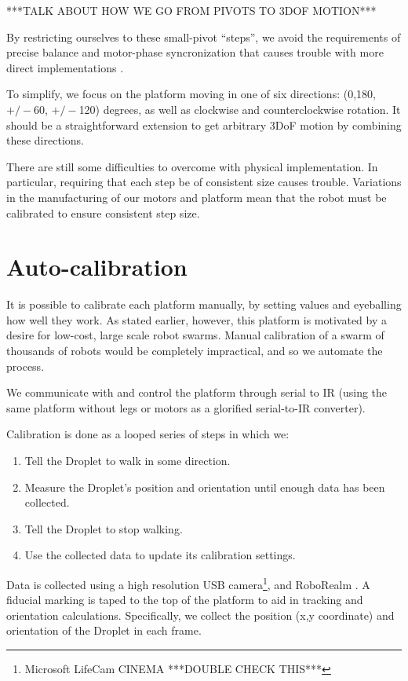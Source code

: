 \documentclass[letterpaper, 10pt, conference]{ieeeconf}
\begin{document}
***TALK ABOUT HOW WE GO FROM PIVOTS TO 3DOF MOTION***

By restricting ourselves to these small-pivot ``steps'', we avoid the requirements of precise balance and motor-phase syncronization that causes trouble with more direct implementations \cite{Vartholomeos2006}.

To simplify, we focus on the platform moving in one of six directions: (0,180, $+/-$60, $+/-$120) degrees, as well as clockwise and counterclockwise rotation. It should be a straightforward extension to get arbitrary 3DoF motion by combining these directions.

 There are still some difficulties to overcome with physical implementation. In particular, requiring that each step be of consistent size causes trouble. Variations in the manufacturing of our motors and platform mean that the robot must be calibrated to ensure consistent step size.

\section{Auto-calibration}

It is possible to calibrate each platform manually, by setting values and eyeballing how well they work. As stated earlier, however, this platform is motivated by a desire for low-cost, large scale robot swarms.  Manual calibration of a swarm of thousands of robots would be completely impractical, and so we automate the process.

We communicate with and control the platform through serial to IR (using the same platform without legs or motors as a glorified serial-to-IR converter). 

Calibration is done as a looped series of steps in which we:
\begin{enumerate}
\item Tell the Droplet to walk in some direction.
\item Measure the Droplet's position and orientation until enough data has been collected.
\item Tell the Droplet to stop walking.
\item Use the collected data to update its calibration settings.
\end{enumerate}
Data is collected using a high resolution USB camera\footnote{Microsoft LifeCam CINEMA ***DOUBLE CHECK THIS***}, and RoboRealm \cite{RoboRealm}. A fiducial marking is taped to the top of the platform to aid in tracking and orientation calculations. Specifically, we collect the position (x,y coordinate) and orientation of the Droplet in each frame.
\end{document}
